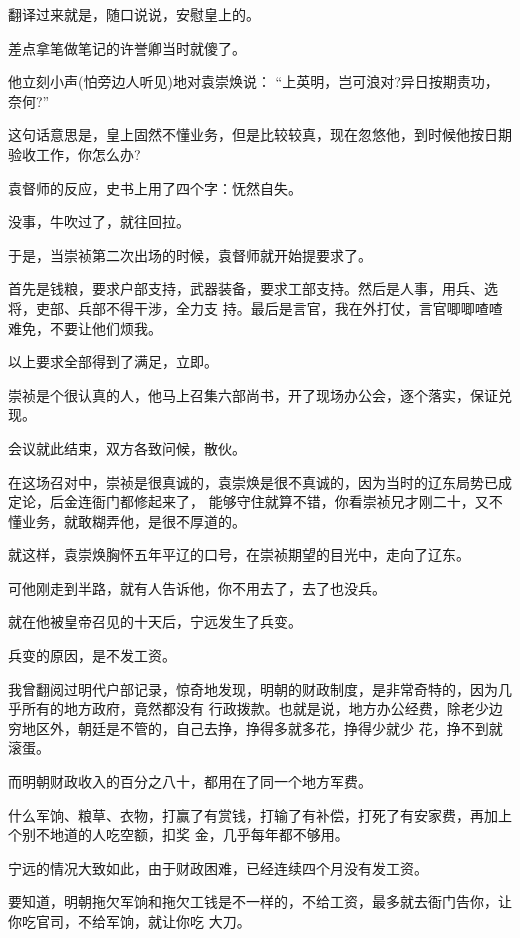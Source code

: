 \documentclass[11pt,a4paper,onecolumn]{article}
\begin{document}
翻译过来就是，随口说说，安慰皇上的。

差点拿笔做笔记的许誉卿当时就傻了。

他立刻小声(怕旁边人听见)地对袁崇焕说： ``上英明，岂可浪对?异日按期责功，奈何?''

这句话意思是，皇上固然不懂业务，但是比较较真，现在忽悠他，到时候他按日期验收工作，你怎么办?

袁督师的反应，史书上用了四个字：怃然自失。

没事，牛吹过了，就往回拉。

于是，当崇祯第二次出场的时候，袁督师就开始提要求了。

首先是钱粮，要求户部支持，武器装备，要求工部支持。然后是人事，用兵、选将，吏部、兵部不得干涉，全力支
持。最后是言官，我在外打仗，言官唧唧喳喳难免，不要让他们烦我。

以上要求全部得到了满足，立即。

崇祯是个很认真的人，他马上召集六部尚书，开了现场办公会，逐个落实，保证兑现。

会议就此结束，双方各致问候，散伙。

在这场召对中，崇祯是很真诚的，袁崇焕是很不真诚的，因为当时的辽东局势已成定论，后金连衙门都修起来了，
能够守住就算不错，你看崇祯兄才刚二十，又不懂业务，就敢糊弄他，是很不厚道的。

就这样，袁崇焕胸怀五年平辽的口号，在崇祯期望的目光中，走向了辽东。

可他刚走到半路，就有人告诉他，你不用去了，去了也没兵。

就在他被皇帝召见的十天后，宁远发生了兵变。

兵变的原因，是不发工资。

我曾翻阅过明代户部记录，惊奇地发现，明朝的财政制度，是非常奇特的，因为几乎所有的地方政府，竟然都没有
行政拨款。也就是说，地方办公经费，除老少边穷地区外，朝廷是不管的，自己去挣，挣得多就多花，挣得少就少
花，挣不到就滚蛋。

而明朝财政收入的百分之八十，都用在了同一个地方\myrule 军费。

什么军饷、粮草、衣物，打赢了有赏钱，打输了有补偿，打死了有安家费，再加上个别不地道的人吃空额，扣奖
金，几乎每年都不够用。

宁远的情况大致如此，由于财政困难，已经连续四个月没有发工资。

要知道，明朝拖欠军饷和拖欠工钱是不一样的，不给工资，最多就去衙门告你，让你吃官司，不给军饷，就让你吃
大刀。

\section[\thesection]{}
\end{document}
